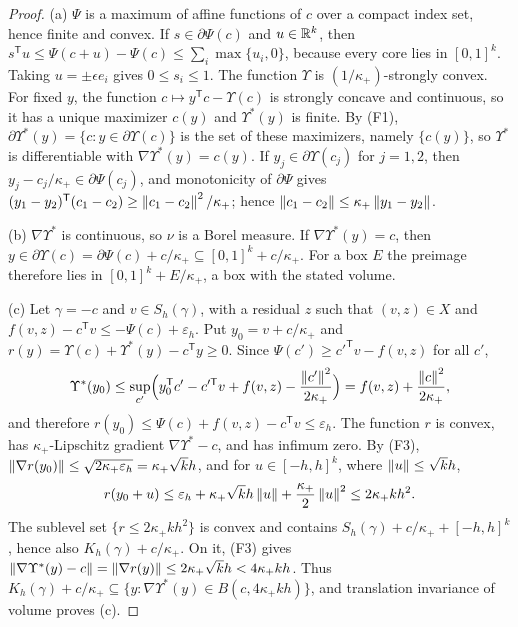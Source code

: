 \begin{proof}
(a) $\Psi$ is a maximum of affine functions of $c$ over a compact index
set, hence finite and convex. If $s\in\partial\Psi(c)$ and $u\in\mathbb R^k$,
then $s^{\mathsf T}u\le\Psi(c+u)-\Psi(c)\le\sum_i\max\{u_i,0\}$, because
every core lies in $[0,1]^k$. Taking $u=\pm\epsilon e_i$ gives
$0\le s_i\le1$. The function $\Upsilon$ is $(1/\kappa_+)$-strongly
convex. For fixed $y$, the function $c\mapsto y^{\mathsf T}c-\Upsilon(c)$
is strongly concave and continuous, so it has a unique maximizer
$c(y)$ and $\Upsilon^*(y)$ is finite. By (F1),
$\partial\Upsilon^*(y)=\{c:y\in\partial\Upsilon(c)\}$ is the set of
these maximizers, namely $\{c(y)\}$, so $\Upsilon^*$ is differentiable
with $\nabla\Upsilon^*(y)=c(y)$. If $y_j\in\partial\Upsilon(c_j)$ for
$j=1,2$, then $y_j-c_j/\kappa_+\in\partial\Psi(c_j)$, and monotonicity of
$\partial\Psi$ gives
$(y_1-y_2)^{\mathsf T}(c_1-c_2)\ge\left\lVert c_1-c_2\right\rVert^2/\kappa_+$; hence
$\left\lVert c_1-c_2\right\rVert\le\kappa_+\left\lVert y_1-y_2\right\rVert$.

(b) $\nabla\Upsilon^*$ is continuous, so $\nu$ is a Borel measure. If
$\nabla\Upsilon^*(y)=c$, then
$y\in\partial\Upsilon(c)=\partial\Psi(c)+c/\kappa_+\subseteq[0,1]^k+c/\kappa_+$.
For a box $E$ the preimage therefore lies in $[0,1]^k+E/\kappa_+$, a box
with the stated volume.

(c) Let $\gamma=-c$ and $v\in S_h(\gamma)$, with a residual $z$ such that
$(v,z)\in X$ and $f(v,z)-c^{\mathsf T}v\le-\Psi(c)+\varepsilon_h$. Put
$y_0=v+c/\kappa_+$ and $r(y)=\Upsilon(c)+\Upsilon^*(y)-c^{\mathsf T}y\ge0$.
Since $\Psi(c')\ge c'^{\mathsf T}v-f(v,z)$ for all $c'$,
\[
 \Upsilon^*(y_0)\le\sup_{c'}\Bigl(y_0^{\mathsf T}c'-c'^{\mathsf T}v+f(v,z)
 -\frac{\left\lVert c'\right\rVert^2}{2\kappa_+}\Bigr)=f(v,z)+\frac{\left\lVert c\right\rVert^2}{2\kappa_+},
\]
and therefore $r(y_0)\le\Psi(c)+f(v,z)-c^{\mathsf T}v\le\varepsilon_h$.
The function $r$ is convex, has $\kappa_+$-Lipschitz gradient
$\nabla\Upsilon^*-c$, and has infimum zero. By (F3),
$\left\lVert\nabla r(y_0)\right\rVert\le\sqrt{2\kappa_+\varepsilon_h}=\kappa_+\sqrt kh$,
and for $u\in[-h,h]^k$, where $\left\lVert u\right\rVert\le\sqrt kh$,
\[
 r(y_0+u)\le\varepsilon_h+\kappa_+\sqrt kh\left\lVert u\right\rVert+\frac{\kappa_+}2\left\lVert u\right\rVert^2
 \le2\kappa_+kh^2.
\]
The sublevel set $\{r\le2\kappa_+kh^2\}$ is convex and contains
$S_h(\gamma)+c/\kappa_+ +[-h,h]^k$, hence also
$K_h(\gamma)+c/\kappa_+$. On it, (F3) gives
$\left\lVert\nabla\Upsilon^*(y)-c\right\rVert=\left\lVert\nabla r(y)\right\rVert\le2\kappa_+\sqrt kh<4\kappa_+kh$.
Thus $K_h(\gamma)+c/\kappa_+\subseteq\{y:\nabla\Upsilon^*(y)\in
B(c,4\kappa_+kh)\}$, and translation invariance of volume proves (c).
\end{proof}

